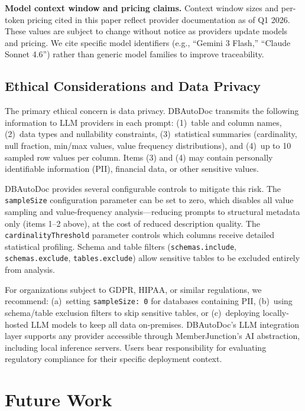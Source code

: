 \documentclass[sigconf, nonacm]{acmart}
\begin{document}
\textbf{Model context window and pricing claims.} Context window sizes and per-token pricing cited in this paper reflect provider documentation as of Q1 2026. These values are subject to change without notice as providers update models and pricing. We cite specific model identifiers (e.g., ``Gemini 3 Flash,'' ``Claude Sonnet 4.6'') rather than generic model families to improve traceability.

\subsection{Ethical Considerations and Data Privacy}

The primary ethical concern is data privacy. DBAutoDoc transmits the following information to LLM providers in each prompt: (1)~table and column names, (2)~data types and nullability constraints, (3)~statistical summaries (cardinality, null fraction, min/max values, value frequency distributions), and (4)~up to 10 sampled row values per column. Items (3) and (4) may contain personally identifiable information (PII), financial data, or other sensitive values.

DBAutoDoc provides several configurable controls to mitigate this risk. The \texttt{sampleSize} configuration parameter can be set to zero, which disables all value sampling and value-frequency analysis---reducing prompts to structural metadata only (items 1--2 above), at the cost of reduced description quality. The \texttt{cardinalityThreshold} parameter controls which columns receive detailed statistical profiling. Schema and table filters (\texttt{schemas.include}, \texttt{schemas.exclude}, \texttt{tables.exclude}) allow sensitive tables to be excluded entirely from analysis.

For organizations subject to GDPR, HIPAA, or similar regulations, we recommend: (a)~setting \texttt{sampleSize:~0} for databases containing PII, (b)~using schema/table exclusion filters to skip sensitive tables, or (c)~deploying locally-hosted LLM models to keep all data on-premises. DBAutoDoc's LLM integration layer supports any provider accessible through MemberJunction's AI abstraction, including local inference servers. Users bear responsibility for evaluating regulatory compliance for their specific deployment context.


\section{Future Work}\label{sec:future}
\end{document}
